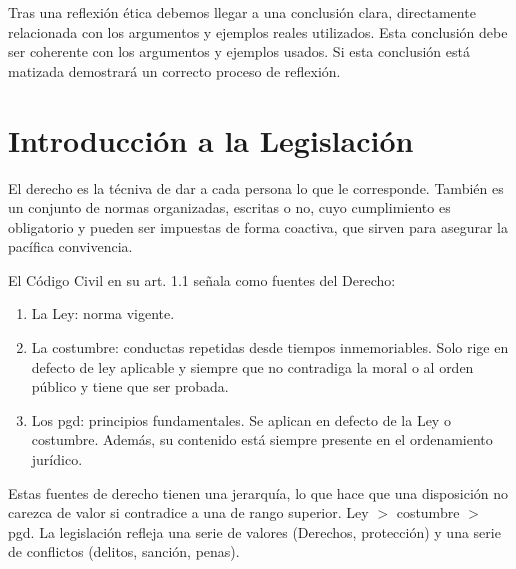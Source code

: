 Tras una reflexión ética debemos llegar a una conclusión clara, directamente relacionada con los argumentos y ejemplos reales utilizados. Esta conclusión debe ser coherente con los argumentos y ejemplos usados. Si esta conclusión está matizada demostrará un correcto proceso de reflexión.

\section{Introducción a la Legislación}
El derecho es la técniva de dar a cada persona lo que le corresponde. También es un conjunto de normas organizadas, escritas o no, cuyo cumplimiento es obligatorio y pueden ser impuestas de forma coactiva, que sirven para asegurar la pacífica convivencia.

El Código Civil en su art. 1.1 señala como fuentes del Derecho:
\begin{enumerate}
    \item La Ley: norma vigente.
    \item La costumbre: conductas repetidas desde tiempos inmemoriables. Solo rige en defecto de ley aplicable y siempre que no contradiga la moral o al orden público y tiene que ser probada.
    \item Los \gls{pgd}: principios fundamentales. Se aplican en defecto de la Ley o costumbre. Además, su contenido está siempre presente en el ordenamiento jurídico.
\end{enumerate}

Estas fuentes de derecho tienen una jerarquía, lo que hace que una disposición no carezca de valor si contradice a una de rango superior. Ley $>$ costumbre $>$ \gls{pgd}.
La legislación refleja una serie de valores (Derechos, protección) y una serie de conflictos (delitos, sanción, penas).
